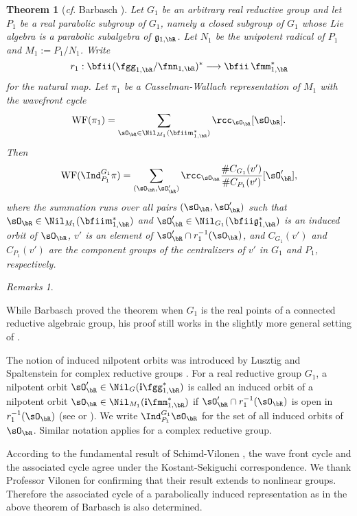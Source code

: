 \documentclass[12pt,a4paper]{amsart}
\newcommand{\WF}{\mathrm{WF}}
\newcommand{\g}{\mathfrak g}
\numberwithin{equation}{section}
\newtheorem{thm}{Theorem}[section]
\theoremstyle{remark}
\newtheorem*{remarks}{Remarks}
\def\sOR{\sO_\bR}
\begin{document}
\begin{thm}[\emph{cf}. Barbasch {\cite[Corollary~5.0.10]{B.Orbit}}]\label{thm:Bar}
  Let $G_1$ be an arbitrary real reductive group and let $P_1$ be a real
  parabolic subgroup of $G_1$, namely a closed subgroup of $G_1$ whose Lie
  algebra is a parabolic subalgebra of $\g_{1,\bR}$. Let $N_1$ be the unipotent
  radical of $P_1$ and $M_1:=P_1/N_1$. Write
  $$r_1: \bfii (\fgg_{1, \bR}/\fnn_{1, \bR})^*\longrightarrow \bfii \, \fmm_{1,
    \bR}^*$$ for the natural map.  Let $\pi_1$ be a Casselman-Wallach
  representation of $M_1$ with the wavefront cycle
\[
\WF(\pi_1) =
\sum_{\sOR\in \Nil_{M_1}(\bfii \frak m^*_{1,\bR})} \rcc_{\sOR} [\sOR].
\]
Then
\[
\WF(\Ind^{G_1}_{P_1} \pi) = \sum_{(\sOR, \sOR')} \rcc_{\sOR}\frac{\# C_{G_1}(v')}{\#
  C_{P_1}(v')}
[\sOR'],
\]
where the summation runs over all pairs $(\sOR, \sOR')$ such that $\sOR \in \Nil_{M_1}(\bfii \frak m^*_{1,\bR})$ and $\sOR' \in \Nil_{G_1}(\bfii \frak g^*_{1,\bR})$ is an induced orbit of $\sOR$, $v'$ is an element  of  $\sOR'\cap r_1^{-1}(\sOR)$, and $C_{G_1}(v')$ and $C_{P_1}(v')$ are the component groups of the centralizers of
$v'$ in $G_1$ and $P_1$, respectively.
\end{thm}

\begin{remarks}
\begin{enumR}
\item While Barbasch proved the theorem when $G_1$ is the real points of a connected
  reductive algebraic group, his proof still works in the slightly more general setting of .
\item The notion of induced nilpotent orbits was introduced by Lusztig and Spaltenstein for complex reductive groups \cite{LS}. For a real reductive group $G_1$, a nilpotent orbit $\sOR' \in \Nil_{G}(\mathbf i \fgg^*_{1,\bR})$ is called an induced orbit of a nilpotent orbit $\sOR\in
  \Nil_{M_1}(\mathbf i \fmm_{1,\bR}^*)$ if $\sOR'\cap r_1^{-1}(\sOR)$ is open in
  $r_1^{-1}(\sOR)$ (see \cite[Definition~5.0.7]{B.Orbit} or \cite{Ohta2}).
  We write $\Ind_{P_1}^{G_1} \sOR$ for the set of all induced orbits of $\sOR$. Similar notation applies for a complex reductive group.

  \item   According to the fundamental result of Schimd-Vilonen \cite{SV}, the wave front cycle
  and the associated cycle agree under the Kostant-Sekiguchi correspondence. We thank Professor Vilonen for confirming that their result extends
  to nonlinear groups. Therefore the associated cycle of a parabolically induced
  representation as in the above theorem of Barbasch is also determined.
\end{enumR}
\end{remarks}
\end{document}
